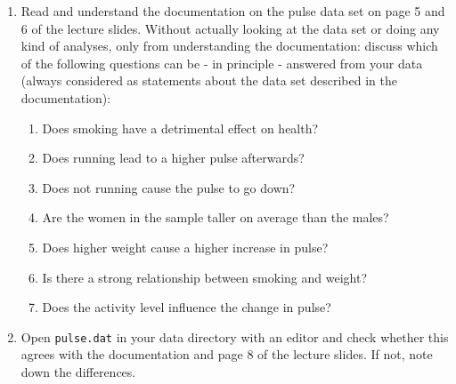 \begin{enumerate}
\item Read and understand the documentation on the pulse data set on page 5 and 6 of the lecture slides. Without actually looking at the data set or doing any kind of analyses, only from understanding the documentation: discuss which of the following questions can be - in principle - answered from your data (always considered as statements about the data set described in the documentation):
\begin{enumerate}
\item Does smoking have a detrimental effect on health?
\item Does running lead to a higher pulse afterwards?
\item Does not running cause the pulse to go down?
\item Are the women in the sample taller on average than the males?
\item Does higher weight cause a higher increase in pulse?
\item Is there a strong relationship between smoking and weight?
\item Does the activity level influence the change in pulse?
\end{enumerate}

\item Open \texttt{pulse.dat} in your data directory with an editor and check whether this agrees with the documentation and page 8 of the lecture slides. If not, note down the differences.


\end{enumerate}
